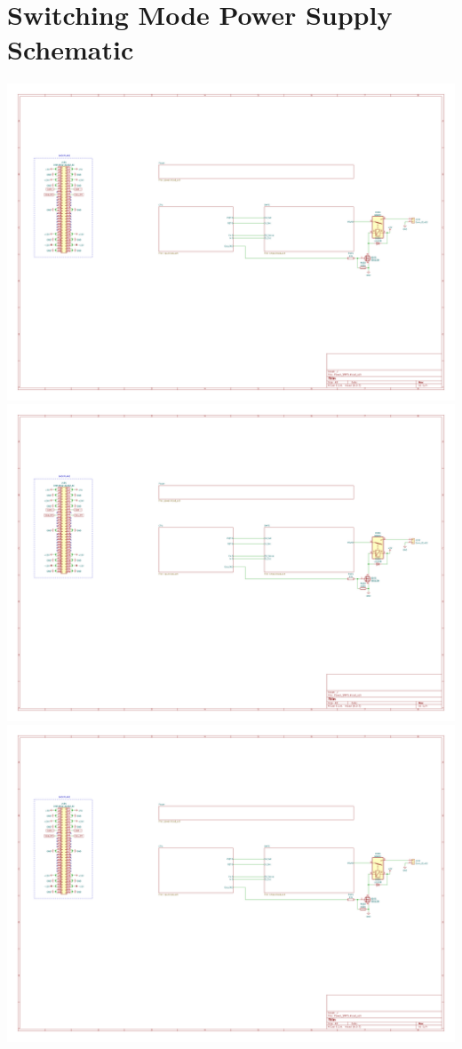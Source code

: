 \documentclass[11pt, a4paper, listof=numbered, captions=tableheading, headinclude, table, xcdraw]{scrreprt}
\begin{document}
\chapter{Switching Mode Power Supply Schematic}
\includegraphics[page=1,angle=90,width=\textwidth]{schematics/Power_SMPS.pdf}\newpage
\includegraphics[page=2,angle=90,width=\textwidth]{schematics/Power_SMPS.pdf}\newpage
\includegraphics[page=3,angle=90,width=\textwidth]{schematics/Power_SMPS.pdf}\newpage
\end{document}
